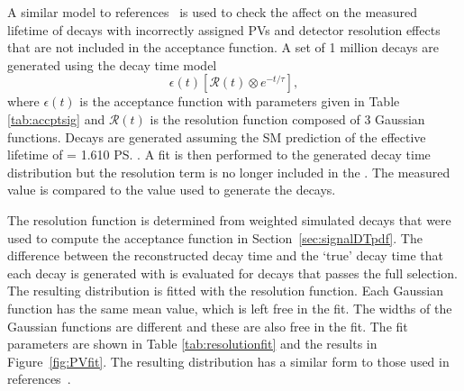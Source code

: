 A similar model to references~\cite{Aaij:2016ohx,Aaij:2015vza} is used to check the affect on the measured lifetime of decays with incorrectly assigned PVs and detector resolution effects that are not included in the acceptance function. A set of 1 million decays are generated using the decay time model 
\begin{equation}
\epsilon (t) [\mathcal{R}(t) \otimes e^{-t/\tau}],
\end{equation}
where $\epsilon (t)$ is the acceptance function with parameters given in Table \ref{tab:accptsig} and $\mathcal{R}(t)$ is the resolution function composed of 3 Gaussian functions. 
Decays are generated assuming the SM prediction of the \bsmumu effective lifetime of \tmumu = 1.610 \ps. A fit is then performed to the generated decay time distribution but  the resolution term is no longer included in the \pdf. The measured \tmumu value is compared to the value used to generate the decays. 


The resolution function is determined from weighted simulated \bsmumu decays that were used to compute the acceptance function in Section~\ref{sec:signalDTpdf}. The difference between the reconstructed decay time and the `true' decay time that each decay is generated with is evaluated for decays that passes the full selection. The resulting distribution is fitted with the resolution function. Each Gaussian function has the same mean value, which is left free in the fit. The widths of the Gaussian functions are different and these are also free in the fit. The fit parameters are shown in Table \ref{tab:resolutionfit} and the results in Figure~\ref{fig:PVfit}. %
The resulting distribution has a similar form to those used in references~\cite{Aaij:2016ohx,Aaij:2015vza}. %


